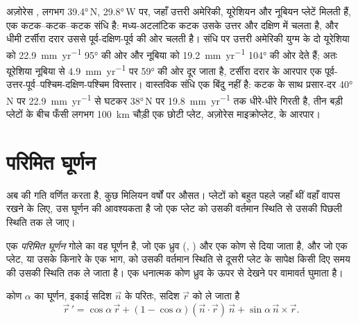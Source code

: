 अज़ोरेस , लगभग \ang{39.4}\,N, \ang{29.8}\,W पर, जहाँ उत्तरी अमेरिकी, यूरेशियन और नूबियन प्लेटें मिलती हैं, एक कटक–कटक–कटक संधि है: मध्य-अटलांटिक कटक उसके उत्तर और दक्षिण में चलता है, और धीमी टर्सीरा दरार उससे पूर्व-दक्षिण-पूर्व की ओर चलती है। संधि पर उत्तरी अमेरिकी युग्म के दो  यूरेशिया को \qty{22.9}{mm.yr^{-1}} \ang{95} की ओर और नूबिया को \qty{19.2}{mm.yr^{-1}} \ang{104} की ओर देते हैं; अतः यूरेशिया नूबिया से \qty{4.9}{mm.yr^{-1}} पर \ang{59} की ओर दूर जाता है, टर्सीरा दरार के आरपार एक पूर्व-उत्तर-पूर्व–पश्चिम-दक्षिण-पश्चिम विस्तार। वास्तविक संधि एक बिंदु नहीं है: कटक के साथ प्रसार-दर \ang{40}\,N पर \qty{22.9}{mm.yr^{-1}} से घटकर \ang{38}\,N पर \qty{19.8}{mm.yr^{-1}} तक धीरे-धीरे गिरती है, तीन बड़ी प्लेटों के बीच फँसी लगभग \qty{100}{km} चौड़ी एक छोटी प्लेट, अज़ोरेस माइक्रोप्लेट, के आरपार।

\section{परिमित घूर्णन}

 अब की गति वर्णित करता है, कुछ मिलियन वर्षों पर औसत। प्लेटों को बहुत पहले जहाँ थीं वहाँ वापस रखने के लिए, उस घूर्णन की आवश्यकता है जो एक प्लेट को उसकी वर्तमान स्थिति से उसकी पिछली स्थिति तक ले जाए।

\begin{definition}[परिमित घूर्णन]\label{def:b1:plate-kinematics:finite-rotation}
एक \emph{परिमित घूर्णन} गोले का वह घूर्णन है, जो एक ध्रुव (, ) और एक कोण से दिया जाता है, और जो एक प्लेट, या उसके किनारे के एक भाग, को उसकी वर्तमान स्थिति से दूसरी प्लेट के सापेक्ष किसी दिए समय की उसकी स्थिति तक ले जाता है। एक धनात्मक कोण ध्रुव के ऊपर से देखने पर वामावर्त घुमाता है।
\end{definition}

\begin{proposition}[रॉड्रिग्ज़ का सूत्र]\label{prop:b1:plate-kinematics:rodrigues}
कोण $\alpha$ का घूर्णन, इकाई सदिश $\vec n$ के परितः, सदिश $\vec r$ को ले जाता है
\[
  \vec r\,' = \cos\alpha\,\vec r + (1 - \cos\alpha)(\vec n\cdot\vec r)\,\vec n
  + \sin\alpha\,\vec n\times\vec r .
\]
\end{proposition}

